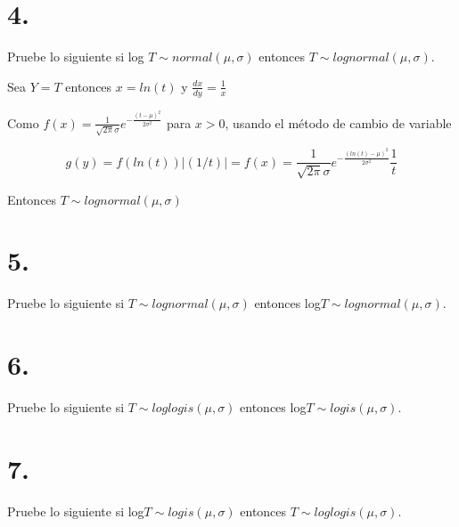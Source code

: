 \documentclass[
]{article}
\begin{document}
\section {4. }

Pruebe lo siguiente si log \(T \sim normal(\mu, \sigma)\) entonces
\(T \sim lognormal(\mu, \sigma)\).

Sea \(Y=T\) entonces \(x=ln(t)\) y \(\frac{dx}{dy} = \frac{1}{x}\)

Como
\(f(x) = \frac{1} {\sqrt{2 \pi} \sigma} e^{- \frac{(t - \mu)^2} {2 \sigma^2}}\)
para \(x>0\), usando el método de cambio de variable

\[g(y) = f(ln(t)) | (1/t) | = f(x) = \frac{1} {\sqrt{2 \pi} \sigma} e^{- \frac{(ln(t) - \mu)^2} {2 \sigma^2}} \frac{1} {t}\]

Entonces \(T \sim lognormal(\mu, \sigma)\)

\section {5. }

Pruebe lo siguiente si \(T \sim lognormal(\mu, \sigma)\) entonces
log\(T \sim lognormal(\mu, \sigma)\).

\section {6. }

Pruebe lo siguiente si \(T \sim loglogis(\mu, \sigma)\) entonces
log\(T \sim logis(\mu, \sigma)\).

\section {7. }

Pruebe lo siguiente si log\(T \sim logis(\mu, \sigma)\) entonces
\(T \sim loglogis(\mu, \sigma)\).
\end{document}

